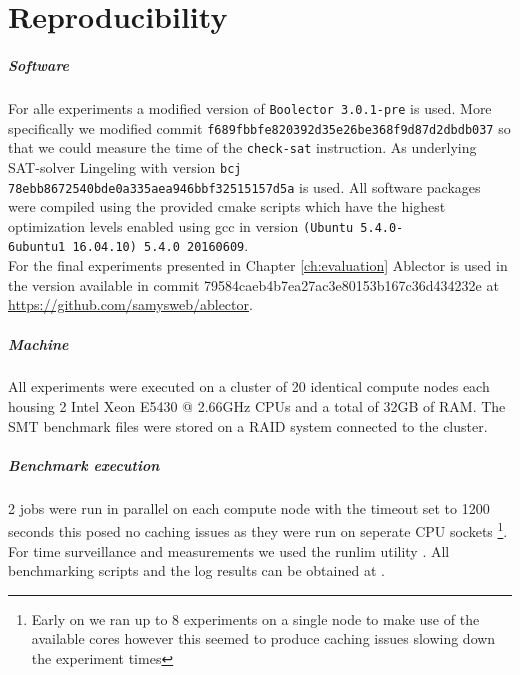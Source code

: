 
\chapter{Reproducibility}
\label{sec:appendix:reproducibility}
\paragraph{Software}
For alle experiments a modified version of \texttt{Boolector 3.0.1-pre} is used.
More specifically we modified commit \texttt{f689fbbfe820392d35e26be368f9d87d2dbdb037} so that we could measure the time of the \texttt{check-sat} instruction.
As underlying SAT-solver Lingeling \cite{Biere-SAT-Competition-2017-solvers} with version \texttt{bcj 78ebb8672540bde0a335aea946bbf32515157d5a} is used.
All software packages were compiled using the provided cmake scripts which have the highest optimization levels enabled using gcc in version \texttt{(Ubuntu 5.4.0-6ubuntu1~16.04.10) 5.4.0 20160609}.\\
For the final experiments presented in Chapter \ref{ch:evaluation} Ablector is used in the version available in commit 79584caeb4b7ea27ac3e80153b167c36d434232e at \url{https://github.com/samysweb/ablector}.

\paragraph{Machine}
All experiments were executed on a cluster of 20 identical compute nodes each housing 2 Intel Xeon E5430 @ 2.66GHz CPUs and a total of 32GB of RAM.
The SMT benchmark files were stored on a RAID system connected to the cluster.

\paragraph{Benchmark execution}
2 jobs were run in parallel on each compute node with the timeout set to 1200 seconds
this posed no caching issues as they were run on seperate CPU sockets
\footnote{Early on we ran up to 8 experiments on a single node to make use of the available cores however this seemed to produce caching issues slowing down the experiment times}.
For time surveillance and measurements we used the runlim utility \cite{runlim}.
All benchmarking scripts and the log results can be obtained at .

\renewcommand{\simplechapterdelim}{.}
\listoffigures